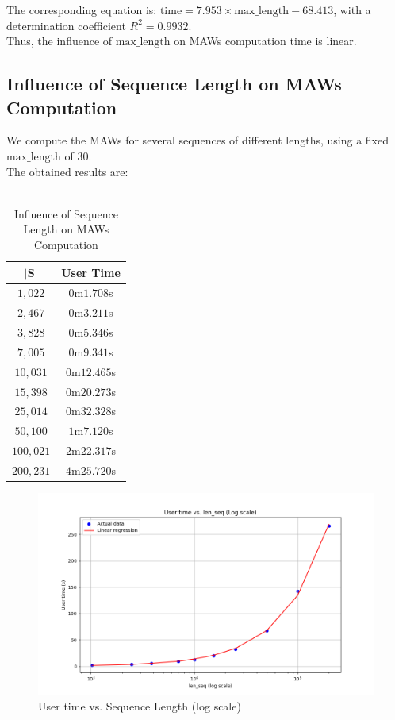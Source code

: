 \documentclass[conference]{IEEEtran}
\begin{document}
The corresponding equation is: $\text{time} = 7.953 \times \text{max\_length} - 68.413$, with a determination coefficient $R^2 = 0.9932$.\\
Thus, the influence of $\text{max\_length}$ on MAWs computation time is linear.

\subsection{Influence of Sequence Length on MAWs Computation}
We compute the MAWs for several sequences of different lengths, using a fixed $\text{max\_length}$ of 30.\\
The obtained results are:\\\\

\begin{table}[htbp]
\caption{Influence of Sequence Length on MAWs Computation}
\begin{center}
\begin{tabular}{|c|c|}
\hline
$\mathbf{|S|}$ & \textbf{User Time} \\
\hline
$1,022$ & $0$m$1.708$s\\
\hline
$2,467$ & $0$m$3.211$s\\
\hline
$3,828$ & $0$m$5.346$s\\
\hline
$7,005$ & $0$m$9.341$s\\
\hline
$10,031$ & $0$m$12.465$s\\
\hline
$15,398$ & $0$m$20.273$s\\
\hline
$25,014$ & $0$m$32.328$s\\
\hline
$50,100$ & $1$m$7.120$s\\
\hline
$100,021$ & $2$m$22.317$s\\
\hline
$200,231$ & $4$m$25.720$s\\
\hline
\end{tabular}
\end{center}
\end{table}

\begin{figure}[htbp]
\centerline{\includegraphics[scale=0.35]{user time vs len_seq(log scale).png}}
\caption{User time vs. Sequence Length (log scale)}
\label{fig}
\end{figure}
\end{document}

